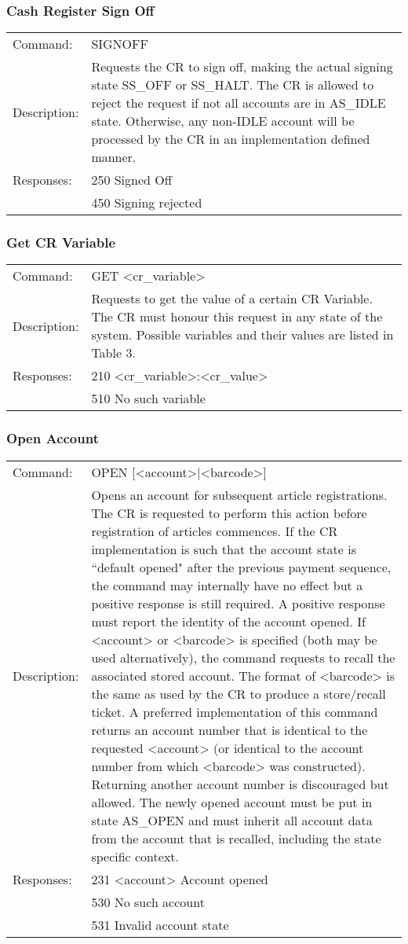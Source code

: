 \subsubsection*{Cash Register Sign Off}
\begin{tabular}{lp{350px}}
Command: & SIGNOFF \\
Description: & Requests the CR to sign off, making the actual signing state SS\_OFF or SS\_HALT. The CR is allowed to reject the request if not all accounts are in AS\_IDLE state. Otherwise, any non-IDLE account will be processed by the CR in an implementation defined manner. \\
Responses: & 250 Signed Off \\
& 450 Signing rejected
\end{tabular}

\subsubsection*{Get CR Variable}
\begin{tabular}{lp{350px}}
Command: & GET <cr\_variable> \\
Description: & Requests to get the value of a certain CR Variable. The CR must honour this request in any state of the system. Possible variables and their values are listed in Table 3. \\
Responses: & 210 <cr\_variable>:<cr\_value> \\
& 510 No such variable
\end{tabular}

\subsubsection*{Open Account}
\begin{tabular}{lp{350px}}
Command: & OPEN [<account>|<barcode>] \\
Description: & Opens an account for subsequent article registrations. The CR is requested to perform this action before registration of articles commences. If the CR implementation is such that the account state is ``default opened" after the previous payment sequence, the command may internally have no effect but a positive response is still required. A positive response must report the identity of the account opened. If <account> or <barcode> is specified (both may be used alternatively), the command requests to recall the associated stored account. The format of <barcode> is the same as used by the CR to produce a store/recall ticket. A preferred implementation of this command returns an account number that is identical to the requested <account> (or identical to the account number from which <barcode> was constructed). Returning another account number is discouraged but allowed. The newly opened account must be put in state AS\_OPEN and must inherit all account data from the account that is recalled, including the state specific context. \\
Responses: & 231 <account> Account opened \\
& 530 No such account \\
& 531 Invalid account state
\end{tabular}

